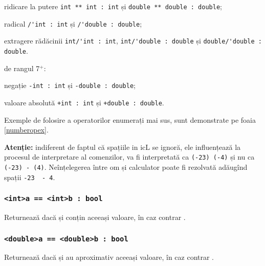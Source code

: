 \begin{icItems}
\begin{icItems}
				ridicare la putere \lstinline|int ** int : int| și \lstinline|double ** double : double|;
			\item
				radical \lstinline|/'int : int| și \lstinline|/'double : double|;
			\item
				extragere rădăcinii \lstinline|int/'int : int|, \lstinline|int/'double : double| și \lstinline|double/'double : double|.
		\end{icItems}
	\item
		de rangul 7$^+$:
		\begin{icItems}
			\item
				negație \lstinline|-int : int| și \lstinline|-double : double|;
			\item
				valoare absolută \lstinline|+int : int| și \lstinline|+double : double|.
		\end{icItems}
\end{icItems}

Exemple de folosire a operatorilor enumerați mai sus, sunt demonstrate pe foaia \ref{numberopex}.

{\bf Atenție:} indiferent de faptul că spațiile in icL se ignoră, ele influențează la procesul de interpretare al comenzilor,  va fi interpretată ca \lstinline`(-23) (-4)` și nu ca \lstinline`(-23) - (4)`. Neînțelegerea între om și calculator poate fi rezolvată adăugînd spații \lstinline`-23  - 4`.

\subsubsection{\lstinline|<int>a == <int>b : bool|}

Returnează \true{} dacă  și  conțin aceeași valoare, în caz contrar \false{}.

\subsubsection{\lstinline|<double>a == <double>b : bool|}

Returnează \true{} dacă  și  au aproximativ aceeași valoare, în caz contrar \false{}.

